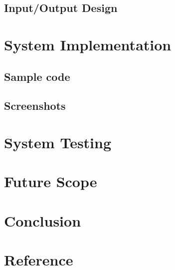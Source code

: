 \documentclass{article}
\begin{document}
\subsection{Input/Output Design}
\vspace{1em}


\newpage

\section{System Implementation}
\vspace{1em}

\subsection{Sample code}
\vspace{1em}
\subsection{Screenshots}
\vspace{1em}


\newpage


\section{System Testing}
\vspace{1em}


\newpage

\section{Future Scope}
\vspace{1em}

\newpage

\section{Conclusion}
\vspace{1em}

\newpage


\section{Reference}
\vspace{1em}


\newpage
\end{document}
